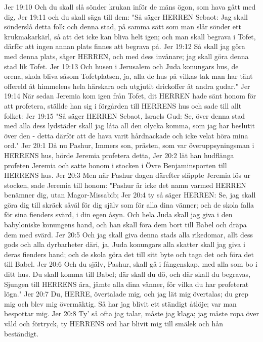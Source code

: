 Jer 19:10  Och du skall slå sönder krukan inför de mäns ögon, som hava gått med dig,
Jer 19:11  och du skall säga till dem: "Så säger HERREN Sebaot: Jag skall sönderslå detta folk och denna stad, på samma sätt som man slår sönder ett krukmakarkärl, så att det icke kan bliva helt igen; och man skall begrava i Tofet, därför att ingen annan plats finnes att begrava på.
Jer 19:12  Så skall jag göra med denna plats, säger HERREN, och med dess invånare; jag skall göra denna stad lik Tofet.
Jer 19:13  Och husen i Jerusalem och Juda konungars hus, de orena, skola bliva såsom Tofetplatsen, ja, alla de hus på vilkas tak man har tänt offereld åt himmelens hela härskara och utgjutit drickoffer åt andra gudar."
Jer 19:14  När sedan Jeremia kom igen från Tofet, dit HERREN hade sänt honom för att profetera, ställde han sig i förgården till HERRENS hus och sade till allt folket:
Jer 19:15  "Så säger HERREN Sebaot, Israels Gud: Se, över denna stad med alla dess lydstäder skall jag låta all den olycka komma, som jag har beslutit över den - detta därför att de hava varit hårdnackade och icke velat höra mina ord."
Jer 20:1  Då nu Pashur, Immers son, prästen, som var överuppsyningsman i HERRENS hus, hörde Jeremia profetera detta,
Jer 20:2  lät han hudflänga profeten Jeremia och satte honom i stocken i Övre Benjaminsporten till HERRENS hus.
Jer 20:3  Men när Pashur dagen därefter släppte Jeremia lös ur stocken, sade Jeremia till honom: "Pashur är icke det namn varmed HERREN benämner dig, utan Magor-Missabib;
Jer 20:4  ty så säger HERREN: Se, jag skall göra dig till skräck såväl för dig själv som för alla dina vänner; och de skola falla för sina fienders svärd, i din egen åsyn. Och hela Juda skall jag giva i den babyloniske konungens hand, och han skall föra dem bort till Babel och dräpa dem med svärd.
Jer 20:5  Och jag skall giva denna stads alla rikedomar, allt dess gods och alla dyrbarheter däri, ja, Juda konungars alla skatter skall jag giva i deras fienders hand; och de skola göra det till sitt byte och taga det och föra det till Babel.
Jer 20:6  Och du själv, Pashur, skall gå i fångenskap, med alla som bo i ditt hus. Du skall komma till Babel; där skall du dö, och där skall du begravas, Sjungen till HERRENS ära, jämte alla dina vänner, för vilka du har profeterat lögn."
Jer 20:7  Du, HERRE, övertalade mig, och jag lät mig övertalas; du grep mig och blev mig övermäktig. Så har jag blivit ett ständigt åtlöje; var man bespottar mig.
Jer 20:8  Ty' så ofta jag talar, måste jag klaga; jag måste ropa över våld och förtryck, ty HERRENS ord har blivit mig till smälek och hån beständigt.
